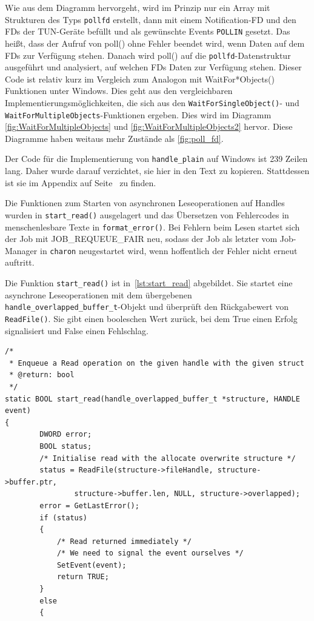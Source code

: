 {Wie aus dem Diagramm hervorgeht, wird im Prinzip nur ein Array mit Strukturen des Typs
\texttt{pollfd} erstellt, dann mit einem Notification-\ac{FD} und den \acp{FD} der TUN-Geräte befüllt
und als gewünschte Events \texttt{POLLIN} gesetzt. Das heißt, dass der Aufruf von poll() ohne
Fehler beendet wird, wenn Daten auf dem \acp{FD} zur Verfügung stehen.
Danach wird poll() auf die \texttt{pollfd}-Datenstruktur ausgeführt und analysiert,
auf welchen \acp{FD} Daten zur Verfügung stehen. Dieser Code ist relativ kurz im
Vergleich zum Analogon mit WaitFor*Objects() Funktionen unter Windows.
Dies geht aus den vergleichbaren Implementierungsmöglichkeiten, die sich aus den
\texttt{WaitForSingleObject()}- und \texttt{WaitForMultipleObjects}-Funktionen ergeben.
Dies wird im Diagramm \autoref{fig:WaitForMultipleObjects}
und \autoref{fig:WaitForMultipleObjects2} hervor. Diese Diagramme haben weitaus
mehr Zustände als \autoref{fig:poll_fd}. 

Der Code für die Implementierung von \texttt{handle\_plain} auf Windows ist 239 Zeilen lang.
Daher wurde darauf verzichtet, sie hier in den Text zu kopieren. Stattdessen ist sie
im Appendix auf Seite~\pageref{lst:handle-plain-windows} zu finden.

Die Funktionen zum Starten von asynchronen Leseoperationen auf Handles
wurden in \texttt{start\_read()} ausgelagert und das Übersetzen von Fehlercodes in menschenlesbare
Texte in \texttt{format\_error()}. Bei Fehlern beim Lesen startet sich der Job
mit JOB\_REQUEUE\_FAIR neu, sodass der Job als letzter vom Job-Manager in \texttt{charon} neugestartet wird,
wenn hoffentlich der Fehler nicht erneut auftritt.

Die Funktion \texttt{start\_read()} ist in~\autoref{lst:start_read} abgebildet.
Sie startet eine asynchrone Leseoperationen mit dem übergebenen \texttt{handle\_overlapped\_buffer\_t}-Objekt
und überprüft den Rückgabewert von \texttt{ReadFile()}. Sie gibt einen booleschen Wert
zurück, bei dem True einen Erfolg signalisiert und False einen Fehlschlag.

\begin{lstlisting}[caption=Code von start\_read(),label=lst:start_read]
/*
 * Enqueue a Read operation on the given handle with the given struct
 * @return: bool
 */
static BOOL start_read(handle_overlapped_buffer_t *structure, HANDLE event)
{
        DWORD error;
        BOOL status;
        /* Initialise read with the allocate overwrite structure */
        status = ReadFile(structure->fileHandle, structure->buffer.ptr,
                structure->buffer.len, NULL, structure->overlapped);
        error = GetLastError();
        if (status)
        {
            /* Read returned immediately */
            /* We need to signal the event ourselves */
            SetEvent(event);
            return TRUE;
        }
        else
        {


\end{lstlisting}}
